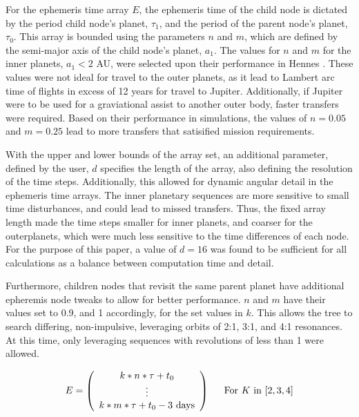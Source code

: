 \documentclass[letterpaper, preprint, paper,11pt]{AAS}	%
\begin{document}
For the ephemeris time array $E$, the ephemeris time of the child node is dictated by the period child node's planet, $\tau_1$, and the period of the parent node's planet, $\tau_0$. This array is bounded using the parameters $n$ and $m$, which are defined by the semi-major axis of the child node's planet, $a_1$. The values for $n$ and $m$ for the inner planets, $a_1 < 2$ AU, were selected upon their performance in Hennes \cite{Hennes2015}. These values were not ideal for travel to the outer planets, as it lead to Lambert arc time of flights in excess of 12 years for travel to Jupiter. Additionally, if Jupiter were to be used for a graviational assist to another outer body, faster transfers were required. Based on their performance in simulations, the values of $n = 0.05$ and $m = 0.25$ lead to more transfers that satisified mission requirements. %

With the upper and lower bounds of the array set, an additional parameter, defined by the user, $d$ specifies the length of the array, also defining the resolution of the time steps. Additionally, this allowed for dynamic angular detail in the ephemeris time arrays. The inner planetary sequences are more sensitive to small time disturbances, and could lead to missed transfers. Thus, the fixed array length made the time steps smaller for inner planets, and coarser for the outerplanets, which were much less sensitive to the time differences of each node. For the purpose of this paper, a value of $d = 16$ was found to be sufficient for all calculations as a balance between computation time and detail. 

Furthermore, children nodes that revisit the same parent planet have additional epheremis node tweaks to allow for better performance. $n$ and $m$ have their values set to 0.9, and 1 accordingly, for the set values in $k$. This allows the tree to search differing, non-impulsive, leveraging orbits of 2:1, 3:1, and 4:1 resonances. At this time, only leveraging sequences with revolutions of less than 1 were allowed.

\begin{equation}
    \label{eq:ephemArrayLev}
    E = 
    \left(\begin{array}{c}
        k*n*\tau + t_0 \\ 
        \vdots \\
        k*m*\tau + t_0 - 3 \text{ days} \\
    \end{array}\right)\hspace{1.5em}
    \text{For } K \text{ in } [2, 3, 4]
\end{equation}
\end{document}
